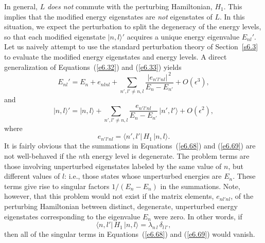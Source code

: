 In general, $L$ {\em does not}\/ commute with the perturbing Hamiltonian, $H_1$.
This implies that the modified energy eigenstates are {\em not}\/ eigenstates
of $L$. In this situation, we expect the perturbation to split the degeneracy
of the energy levels, so that each modified eigenstate $|n,l\rangle'$ acquires
a unique energy eigenvalue $E_{nl}'$. Let us naively attempt to use the standard
perturbation theory of Section~\ref{s6.3} to evaluate the modified 
energy eigenstates
and energy levels. A direct generalization of Equations~(\ref{e6.32}) and (\ref{e6.33}) yields
\begin{equation}\label{e6.68}
E_{nl}' = E_n + e_{nlnl} + \sum_{n', l' \neq n,l}
\frac{|e_{n'l'nl}|^{\,2}}{E_n - E_{n'}} + O(\epsilon^3),
\end{equation}
and
\begin{equation}\label{e6.69}
|n, l\rangle' = |n,l\rangle + \sum_{n', l'\neq n, l}
\frac{e_{n'l'nl}}{E_n-E_{n'}}\,|n',l'\rangle + O(\epsilon^2),
\end{equation}
where 
\begin{equation}
e_{n'l'nl} = \langle n',l'|\,H_1\,|n,l\rangle.
\end{equation}
It is fairly obvious that the summations in Equations~(\ref{e6.68}) and (\ref{e6.69}) are not
well-behaved if the $n$th energy level is degenerate. The problem terms
are those involving unperturbed eigenstates labeled by the same value of $n$, but different
values of $l$: {\rm i.e.}, those states whose unperturbed energies are $E_n$.  These
terms give rise to singular factors $1/(E_n - E_n)$ in the summations. 
Note, however, that this problem would not exist if the matrix
elements, $e_{nl'nl}$, of the perturbing Hamiltonian between distinct, 
degenerate, unperturbed energy eigenstates 
corresponding to the eigenvalue $E_n$ were zero. In other words, if
\begin{equation}\label{e6.71}
\langle n, l' |\,H_1\,| n, l\rangle = \lambda_{n\,l}\, \delta_{l\,l'},
\end{equation}
then all of the singular terms in Equations~(\ref{e6.68}) and (\ref{e6.69}) would vanish. 

